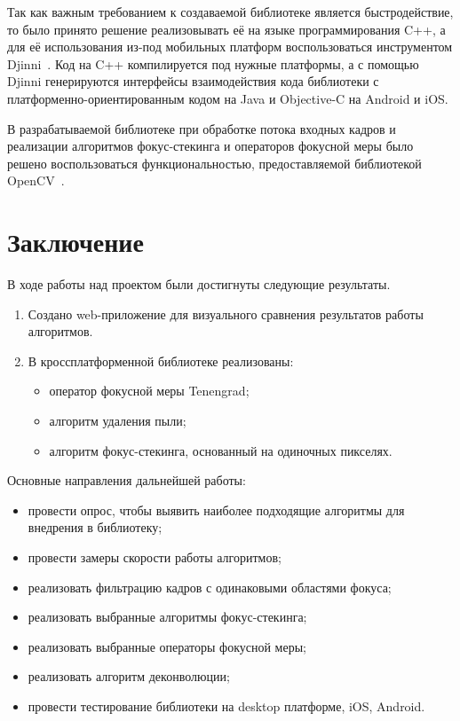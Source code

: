\documentclass[14pt]{matmex-diploma-custom}
\begin{document}
%
% 
Так как важным требованием к создаваемой библиотеке является быстродействие, то было принято решение реализовывать её на языке программирования C++, а для её использования из-под мобильных платформ воспользоваться инструментом Djinni~\cite{Djinni}.
Код на C++ компилируется под нужные платформы, а с помощью Djinni генерируются интерфейсы взаимодействия кода библиотеки с платформенно-ориентированным кодом на Java и Objective-C на Android и iOS. 
\par
В разрабатываемой библиотеке при обработке потока входных кадров и реализации алгоритмов фокус-стекинга и операторов фокусной меры было решено воспользоваться функциональностью, предоставляемой библиотекой OpenCV~\cite{OpenCV}.

\section*{Заключение}
В ходе работы над проектом были достигнуты следующие результаты.
\begin{enumerate}
    \item Создано web-приложение для визуального сравнения результатов работы алгоритмов. 
    \item В кроссплатформенной библиотеке реализованы:
        \begin{itemize}
            \item оператор фокусной меры Tenengrad;
            \item алгоритм удаления пыли;
            \item алгоритм фокус-стекинга, основанный на одиночных пикселях.
        \end{itemize}
\end{enumerate}

\par
Основные направления дальнейшей работы:
\begin{itemize}
    \item провести опрос, чтобы выявить наиболее подходящие алгоритмы для внедрения в библиотеку;
    \item провести замеры скорости работы алгоритмов;
    \item реализовать фильтрацию кадров с одинаковыми областями фокуса;
    \item реализовать выбранные алгоритмы фокус-стекинга;
    \item реализовать выбранные операторы фокусной меры;
    \item реализовать алгоритм деконволюции;
    \item провести тестирование библиотеки на desktop платформе, iOS, Android.
\end{itemize}

\setmonofont[Mapping=tex-text]{CMU Typewriter Text}


\end{document}
